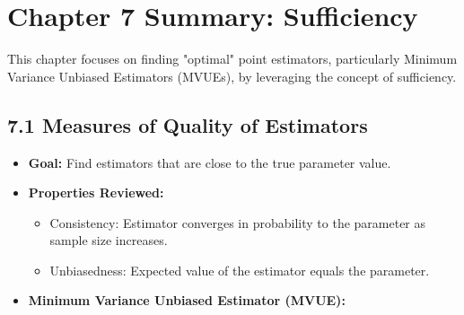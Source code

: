 \section{Chapter 7 Summary: Sufficiency}

This chapter focuses on finding "optimal" point estimators, particularly Minimum Variance Unbiased Estimators (MVUEs), by leveraging the concept of sufficiency.

\subsection{7.1 Measures of Quality of Estimators}

\begin{itemize}
	\item \textbf{Goal:} Find estimators that are close to the true parameter value.
	\item \textbf{Properties Reviewed:}
	\begin{itemize}
		\item Consistency: Estimator converges in probability to the parameter as sample size increases.
		\item Unbiasedness: Expected value of the estimator equals the parameter.
	\end{itemize}
	\item \textbf{Minimum Variance Unbiased Estimator (MVUE):}
\end{itemize}

